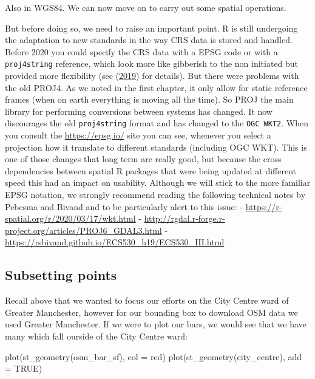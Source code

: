 \documentclass[
  krantz2]{krantz}
\makeatletter
\newenvironment{Shaded}{\begin{snugshade}}{\end{snugshade}}
\newcommand{\AttributeTok}[1]{\textcolor[rgb]{0.61,0.61,0.61}{#1}}
\newcommand{\ConstantTok}[1]{\textcolor[rgb]{0,0,0}{#1}}
\newcommand{\FunctionTok}[1]{\textcolor[rgb]{0,0,0}{#1}}
\newcommand{\NormalTok}[1]{#1}
\newcommand{\StringTok}[1]{\textcolor[rgb]{0.5,0.5,0.5}{#1}}
\newenvironment{kframe}{%
\medskip{}
\setlength{\fboxsep}{.8em}
 \def\at@end@of@kframe{}%
 \ifinner\ifhmode%
  \def\at@end@of@kframe{\end{minipage}}%
  \begin{minipage}{\columnwidth}%
 \fi\fi%
 \def\FrameCommand##1{\hskip\@totalleftmargin \hskip-\fboxsep
 \colorbox{shadecolor}{##1}\hskip-\fboxsep
     \hskip-\linewidth \hskip-\@totalleftmargin \hskip\columnwidth}%
 \MakeFramed {\advance\hsize-\width
   \@totalleftmargin\z@ \linewidth\hsize
   \@setminipage}}%
 {\par\unskip\endMakeFramed%
 \at@end@of@kframe}
\renewenvironment{Shaded}{\begin{kframe}}{\end{kframe}}
\makeatother
\begin{document}
Also in WGS84. We can now move on to carry out some spatial operations.

But before doing so, we need to raise an important point. R is still undergoing the adaptation to new standards in the way CRS data is stored and handled. Before 2020 you could specify the CRS data with a EPSG code or with a \texttt{proj4string} reference, which look more like gibberish to the non initiated but provided more flexibility (see (\protect\hyperlink{ref-Lovelace_2019}{2019}) for details). But there were problems with the old PROJ4. As we noted in the first chapter, it only allow for static reference frames (when on earth everything is moving all the time). So PROJ the main library for performing conversions between systems has changed. It now discourages the old \texttt{proj4string} format and has changed to the \texttt{OGC\ WKT2}. When you consult the \url{https://epsg.io/} site you can see, whenever you select a projection how it translate to different standards (including OGC WKT). This is one of those changes that long term are really good, but because the cross dependencies between spatial R packages that were being updated at different speed this had an impact on usability. Although we will stick to the more familiar EPSG notation, we strongly recommend reading the following technical notes by Pebesma and Bivand and to be particularly alert to this issue:
- \url{https://r-spatial.org/r/2020/03/17/wkt.html}
- \url{http://rgdal.r-forge.r-project.org/articles/PROJ6_GDAL3.html}
- \url{https://rsbivand.github.io/ECS530_h19/ECS530_III.html}

\hypertarget{subsetting-points}{%
\subsection{Subsetting points}\label{subsetting-points}}

Recall above that we wanted to focus our efforts on the City Centre ward of Greater Manchester, however for our bounding box to download OSM data we used Greater Manchester. If we were to plot our bars, we would see that we have many which fall ourside of the City Centre ward:

\begin{Shaded}
\begin{Highlighting}[]
\FunctionTok{plot}\NormalTok{(}\FunctionTok{st\_geometry}\NormalTok{(osm\_bar\_sf), }\AttributeTok{col =} \StringTok{\textquotesingle{}red\textquotesingle{}}\NormalTok{)}
\FunctionTok{plot}\NormalTok{(}\FunctionTok{st\_geometry}\NormalTok{(city\_centre),  }\AttributeTok{add =} \ConstantTok{TRUE}\NormalTok{)}
\end{Highlighting}
\end{Shaded}
\end{document}
